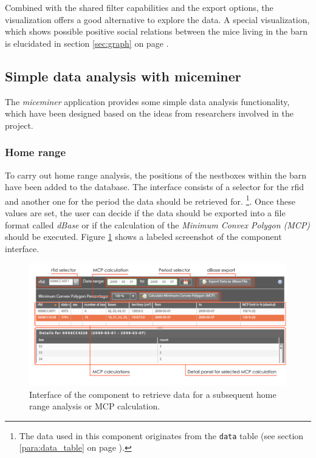 Combined with the shared filter capabilities and the export options, the visualization offers a good alternative to explore the data. A special visualization, which shows possible positive social relations between the mice living in the barn is elucidated in section \ref{sec:graph} on page \pageref{sec:graph}.

\subsection{Simple data analysis with miceminer}
\label{subsec:data_ana} 

The \textit{miceminer} application provides some simple data analysis functionality, which have been designed based on the ideas from researchers involved in the project.

\subsubsection{Home range}
\label{subsubsec:homerangedata}

To carry out home range analysis, the positions of the nestboxes within the barn have been added to the database. The interface consists of a selector for the rfid and another one for the period the data should be retrieved for. \footnote{The data used in this component originates from the \lstinline|data| table (see section \ref{para:data_table} on page \pageref{para:data_table}).}. Once these values are set, the user can decide if the data should be exported into a file format called \textit{dBase} or if the calculation of the \textit{Minimum Convex Polygon (MCP)} should be executed. Figure \ref{fig:home_range} shows a labeled screenshot of the component interface.

\begin{figure}[htpb]
\begin{center}
  \includegraphics[width=.75\textwidth]{assets/pdf/home_range.pdf}
  \caption[Home range component interface]{Interface of the component to retrieve data for a subsequent home range analysis or MCP calculation.}
  \label{fig:home_range}
\end{center}
\end{figure}

